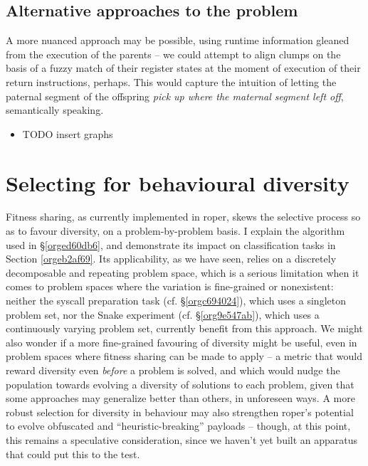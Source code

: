 \documentclass[12pt,glossary]{dalthesis}
\begin{document}
\subsection{Alternative approaches to the problem}
\label{sec:org63fd8f9}

A more nuanced approach may be possible, using runtime information
gleaned from the execution of the parents -- we could attempt to align 
clumps on the basis of a fuzzy match of their register states at the moment of
execution of their return instructions, perhaps. This would capture the intuition
of letting the paternal segment of the offspring \emph{pick up where the maternal segment
left off}, semantically speaking.

\begin{itemize}
\item TODO insert graphs
\end{itemize}

\section{Selecting for behavioural diversity}
\label{sec:org3bcdb2d}



Fitness sharing, as currently implemented in \gls{roper}, skews the selective process
so as to favour diversity, on a problem-by-problem basis. I explain the algorithm
used in \S \ref{orged60db6}, and demonstrate its impact on classification tasks in 
Section \ref{orgeb2af69}. Its applicability, as we have seen, relies
on a discretely decomposable and repeating problem space, which is a serious limitation
when it comes to problem spaces where the variation is fine-grained or nonexistent:
neither the syscall preparation task (cf. \S \ref{orgc694024}), which uses a
singleton problem set, nor the
Snake experiment (cf. \S \ref{org9e547ab}), which uses a continuously
varying problem set, currently benefit from this approach. We might also wonder if
a more fine-grained favouring of diversity might be useful, even in problem spaces
where fitness sharing can be made to apply -- a metric that would reward diversity
even \emph{before} a problem is solved, and which would nudge the population towards
evolving a diversity of solutions to each problem, given that some approaches may
generalize better than others, in unforeseen ways. A more robust selection for
diversity in behaviour may also strengthen \gls{roper}'s potential to evolve 
obfuscated and ``heuristic-breaking'' payloads -- though, at this point, this remains
a speculative consideration, since we haven't yet built an apparatus that could
put this to the test. 
\end{document}
